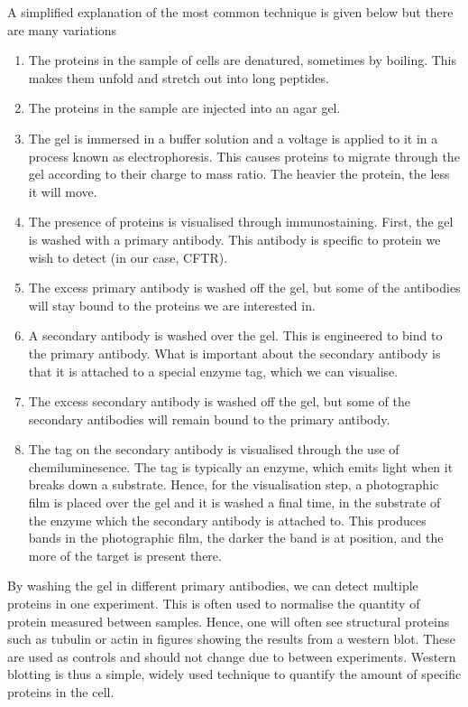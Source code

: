 A simplified explanation of the most common technique is given below but there are many variations
\begin{enumerate}
	\item The proteins in the sample of cells are denatured, sometimes by boiling. This makes them unfold and stretch out into long peptides. 
	\item The proteins in the sample are injected into an agar gel.
	\item The gel is immersed in a buffer solution and a voltage is applied to it in a process known as electrophoresis. This causes proteins to migrate through the gel according to their charge to mass ratio. The heavier the protein, the less it will move. 
	\item The presence of proteins is visualised through immunostaining. First, the gel is washed with a primary antibody. This antibody is specific to protein we wish to detect (in our case, CFTR). 
	\item The excess primary antibody is washed off the gel, but some of the antibodies will stay bound to the proteins we are interested in. 
	\item A secondary antibody is washed over the gel. This is engineered to bind to the primary antibody. What is important about the secondary antibody is that it is attached to a special enzyme tag, which we can visualise.  
	\item The excess secondary antibody is washed off the gel, but some of the secondary antibodies will remain bound to the primary antibody.
	\item The tag on the secondary antibody is visualised through the use of chemiluminesence. The tag is typically an enzyme, which emits light when it breaks down a substrate. Hence, for the visualisation step, a photographic film is placed over the gel and it is washed a final time, in the substrate of the enzyme which the secondary antibody is attached to. This produces bands in the photographic film, the darker the band is at position, and the more of the target is present there.
\end{enumerate}
By washing the gel in different primary antibodies, we can detect multiple proteins in one experiment. This is often used to normalise the quantity of protein measured between samples. Hence, one will often see structural proteins such as tubulin or actin in figures showing the results from a western blot. These are used as controls and should not change due to between experiments. Western blotting is thus a simple, widely used technique to quantify the amount of specific proteins in the cell. 

